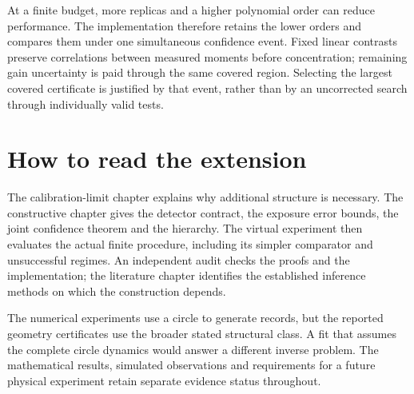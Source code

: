 At a finite budget, more replicas and a higher polynomial order can reduce
performance. The implementation therefore retains the lower orders and
compares them under one simultaneous confidence event. Fixed linear contrasts
preserve correlations between measured moments before concentration; remaining
gain uncertainty is paid through the same covered region. Selecting the
largest covered certificate is justified by that event, rather than by an
uncorrected search through individually valid tests.

\section{How to read the extension}

The calibration-limit chapter explains why additional structure is necessary.
The constructive chapter gives the detector contract, the exposure error
bounds, the joint confidence theorem and the hierarchy. The virtual experiment
then evaluates the actual finite procedure, including its simpler comparator
and unsuccessful regimes. An independent audit checks the proofs and the
implementation; the literature chapter identifies the established inference
methods on which the construction depends.

The numerical experiments use a circle to generate records, but the reported
geometry certificates use the broader stated structural class. A fit that
assumes the complete circle dynamics would answer a different inverse problem.
The mathematical results, simulated observations and requirements for a future
physical experiment retain separate evidence status throughout.
